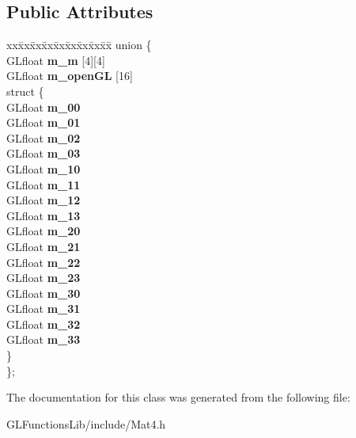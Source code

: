\subsection*{Public Attributes}
\begin{DoxyCompactItemize}
\item 
\begin{tabbing}
xx\=xx\=xx\=xx\=xx\=xx\=xx\=xx\=xx\=\kill
union \{\\
\>GLfloat {\bfseries m\_m} \mbox{[}4\mbox{]}\mbox{[}4\mbox{]}\\
\>GLfloat {\bfseries m\_openGL} \mbox{[}16\mbox{]}\\
\>struct \{\\
\>\>GLfloat {\bfseries m\_00}\\
\>\>GLfloat {\bfseries m\_01}\\
\>\>GLfloat {\bfseries m\_02}\\
\>\>GLfloat {\bfseries m\_03}\\
\>\>GLfloat {\bfseries m\_10}\\
\>\>GLfloat {\bfseries m\_11}\\
\>\>GLfloat {\bfseries m\_12}\\
\>\>GLfloat {\bfseries m\_13}\\
\>\>GLfloat {\bfseries m\_20}\\
\>\>GLfloat {\bfseries m\_21}\\
\>\>GLfloat {\bfseries m\_22}\\
\>\>GLfloat {\bfseries m\_23}\\
\>\>GLfloat {\bfseries m\_30}\\
\>\>GLfloat {\bfseries m\_31}\\
\>\>GLfloat {\bfseries m\_32}\\
\>\>GLfloat {\bfseries m\_33}\\
\>\} \hypertarget{unionMat4_1_1_0D0_a401018066c0f587c933117afe577f73f}{}\label{unionMat4_1_1_0D0_a401018066c0f587c933117afe577f73f}
\\
\}; \hypertarget{classMat4_a2cca9586be7e8f4776d52f91feaf7b0b}{}\label{classMat4_a2cca9586be7e8f4776d52f91feaf7b0b}
\\

\end{tabbing}\end{DoxyCompactItemize}


The documentation for this class was generated from the following file\+:\begin{DoxyCompactItemize}
\item 
G\+L\+Functions\+Lib/include/Mat4.\+h\end{DoxyCompactItemize}
